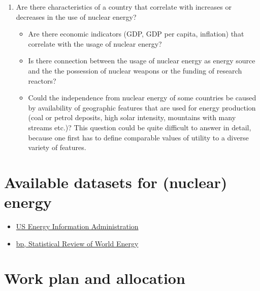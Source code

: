 \documentclass[a4paper,10pt]{scrartcl}
\begin{document}
\begin{enumerate}
\item{Are there characteristics of a country that correlate with increases or decreases in the use of nuclear energy?}

	\begin{itemize}
	\item Are there economic indicators (GDP, GDP per capita, inflation) that correlate with the usage of nuclear energy?
	\item Is there connection between the usage of nuclear energy as energy source and the the possession of nuclear weapons or the funding of research reactors?
	\item Could the independence from nuclear energy of some countries be caused by availability of geographic features that are used for energy production (coal or petrol deposits, high solar intensity, mountains with many streams etc.)? This question could be quite difficult to answer in detail, because one first has to define comparable values of utility to a diverse variety of features.
	\end{itemize}

\end{enumerate}


	
\section*{Available datasets for (nuclear) energy}
	\begin{itemize}
		\item
			\href{https://www.eia.gov/international/data/world}{US Energy Information Administration}
		
		\item
			\href{https://www.bp.com/en/global/corporate/energy-economics/statistical-review-of-world-energy.html}{bp, Statistical Review of World Energy}
		
	\end{itemize}
	

\section*{Work plan and allocation}
\end{document}

